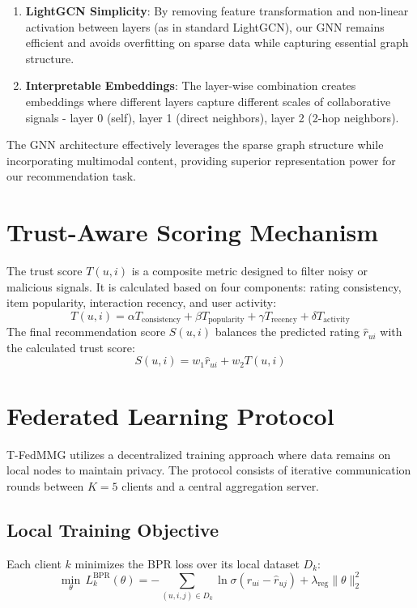 \documentclass[12pt,a4paper]{report}
\begin{document}
{\begin{enumerate}
    \item \textbf{LightGCN Simplicity}: By removing feature transformation and non-linear activation between layers (as in standard LightGCN), our GNN remains efficient and avoids overfitting on sparse data while capturing essential graph structure.
    
    \item \textbf{Interpretable Embeddings}: The layer-wise combination creates embeddings where different layers capture different scales of collaborative signals - layer 0 (self), layer 1 (direct neighbors), layer 2 (2-hop neighbors).
\end{enumerate}

The GNN architecture effectively leverages the sparse graph structure while incorporating multimodal content, providing superior representation power for our recommendation task.

\section{Trust-Aware Scoring Mechanism}
The trust score $T(u,i)$ is a composite metric designed to filter noisy or malicious signals. It is calculated based on four components: rating consistency, item popularity, interaction recency, and user activity:
\begin{equation}
T(u,i) = \alpha T_{\text{consistency}} + \beta T_{\text{popularity}} + \gamma T_{\text{recency}} + \delta T_{\text{activity}}
\end{equation}
The final recommendation score $S(u,i)$ balances the predicted rating $\hat{r}_{ui}$ with the calculated trust score:
\begin{equation}
S(u,i) = w_1 \hat{r}_{ui} + w_2 T(u,i)
\end{equation}

\section{Federated Learning Protocol}
T-FedMMG utilizes a decentralized training approach where data remains on local nodes to maintain privacy. The protocol consists of iterative communication rounds between $K=5$ clients and a central aggregation server.

\subsection{Local Training Objective}
Each client $k$ minimizes the BPR loss over its local dataset $D_k$:
\begin{equation}
\min_\theta \, L_k^{\text{BPR}}(\theta) = -\sum_{(u,i,j) \in D_k} \ln \sigma(\hat{r}_{ui} - \hat{r}_{uj}) + \lambda_{\text{reg}} \|\theta\|^2_2
\end{equation}

}
\end{document}
